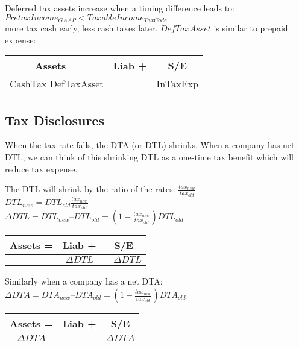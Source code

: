 Deferred tax assets increase when a timing difference leads to: \\
 $PretaxIncome_{GAAP}<Taxable Income_{TaxCode}	$ \\
more tax cash early, less cash taxes later.  $DefTaxAsset$ is similar to prepaid expense:
 
\begin{tabular}{ |c||c|c| } 
	\hline
	Assets = & Liab +  & S/E	 \\ 
	\hline
	CashTax  DefTaxAsset &  & InTaxExp	 \\ 
	
	\hline
\end{tabular}   

\subsection*{ Tax Disclosures}

When the tax rate falls, the  DTA (or DTL) shrinks. When a company has net DTL, we can think of this shrinking DTL as a one-time tax benefit which will reduce tax expense.

The DTL will shrink by the ratio of the rates:  $\frac{tax_{new}}{tax_{old}}$ \\

$ DTL_{new} = DTL _{old} \frac{tax_{new}}{tax_{old}} $ \\

$ \Delta DTL = DTL_{new} – DTL _{old} = (1-\frac{tax_{new}}{tax_{old}})DTL _{old}$

 
\begin{tabular}{ |c||c|c| } 
	\hline
	Assets = & Liab +  & S/E	 \\ 
	\hline
	& $\Delta DTL$ &   $-\Delta DTL$	 \\ 
	
	\hline
\end{tabular}   

Similarly when a company has a net DTA: \\

$ \Delta DTA = DTA_{new} – DTA _{old} = (1-\frac{tax_{new}}{tax_{old}})DTA _{old}$


\begin{tabular}{ |c||c|c| } 
	\hline
	Assets = & Liab +  & S/E	 \\ 
	\hline
	 $\Delta DTA$ &  & $\Delta DTA$	 \\ 
	
	\hline
\end{tabular} 


